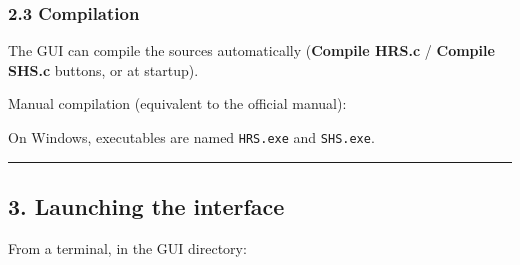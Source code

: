 \begin{Shaded}
\begin{Highlighting}[]
\end{Highlighting}
\end{Shaded}

\hypertarget{compilation}{%
\subsubsection{2.3 Compilation}\label{compilation}}

The GUI can compile the sources automatically (\textbf{Compile HRS.c} /
\textbf{Compile SHS.c} buttons, or at startup).

Manual compilation (equivalent to the official manual):

\begin{Shaded}
\begin{Highlighting}[]
 
 
\end{Highlighting}
\end{Shaded}

On Windows, executables are named \texttt{HRS.exe} and \texttt{SHS.exe}.

\begin{center}\rule{0.5\linewidth}{0.5pt}\end{center}

\hypertarget{launching-the-interface}{%
\subsection{3. Launching the interface}\label{launching-the-interface}}

From a terminal, in the GUI directory:

\begin{Shaded}
\begin{Highlighting}[]
\end{Highlighting}
\end{Shaded}

